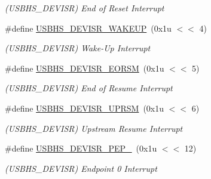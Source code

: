 \begin{DoxyCompactItemize}
\begin{DoxyCompactList}\small\item\em (U\+S\+B\+H\+S\+\_\+\+D\+E\+V\+I\+SR) End of Reset Interrupt \end{DoxyCompactList}\item 
\mbox{\label{group__SAMV71__USBHS_ga26789a96cbd9b97ff9c15a1f47f7b58c}} 
\#define \mbox{\hyperlink{group__SAMV71__USBHS_ga26789a96cbd9b97ff9c15a1f47f7b58c}{U\+S\+B\+H\+S\+\_\+\+D\+E\+V\+I\+S\+R\+\_\+\+W\+A\+K\+E\+UP}}~(0x1u $<$$<$ 4)
\begin{DoxyCompactList}\small\item\em (U\+S\+B\+H\+S\+\_\+\+D\+E\+V\+I\+SR) Wake-\/\+Up Interrupt \end{DoxyCompactList}\item 
\mbox{\label{group__SAMV71__USBHS_gacc3e8ecbd2d67d14c5a2166b1ac8b0cd}} 
\#define \mbox{\hyperlink{group__SAMV71__USBHS_gacc3e8ecbd2d67d14c5a2166b1ac8b0cd}{U\+S\+B\+H\+S\+\_\+\+D\+E\+V\+I\+S\+R\+\_\+\+E\+O\+R\+SM}}~(0x1u $<$$<$ 5)
\begin{DoxyCompactList}\small\item\em (U\+S\+B\+H\+S\+\_\+\+D\+E\+V\+I\+SR) End of Resume Interrupt \end{DoxyCompactList}\item 
\mbox{\label{group__SAMV71__USBHS_gaf888278280758a1d066109e9f8728b8d}} 
\#define \mbox{\hyperlink{group__SAMV71__USBHS_gaf888278280758a1d066109e9f8728b8d}{U\+S\+B\+H\+S\+\_\+\+D\+E\+V\+I\+S\+R\+\_\+\+U\+P\+R\+SM}}~(0x1u $<$$<$ 6)
\begin{DoxyCompactList}\small\item\em (U\+S\+B\+H\+S\+\_\+\+D\+E\+V\+I\+SR) Upstream Resume Interrupt \end{DoxyCompactList}\item 
\mbox{\label{group__SAMV71__USBHS_gab1c55f407682832d960812c3c497c6fe}} 
\#define \mbox{\hyperlink{group__SAMV71__USBHS_gab1c55f407682832d960812c3c497c6fe}{U\+S\+B\+H\+S\+\_\+\+D\+E\+V\+I\+S\+R\+\_\+\+P\+E\+P\+\_}}~(0x1u $<$$<$ 12)
\begin{DoxyCompactList}\small\item\em (U\+S\+B\+H\+S\+\_\+\+D\+E\+V\+I\+SR) Endpoint 0 Interrupt \end{DoxyCompactList}\item 

\end{DoxyCompactItemize}
